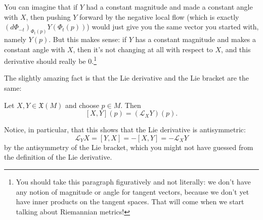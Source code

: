 You can imagine that if $Y$ had a constant magnitude and made a constant angle with $X$, then pushing $Y$ forward by the negative local flow (which is exactly $(d\Phi_{-t})_{\Phi_t(p)}Y(\Phi_t(p))$) would just give you the same vector you started with, namely $Y(p)$. But this makes sense: if $Y$ has a constant magnitude and makes a constant angle with $X$, then it's not changing at all with respect to $X$, and this derivative should really be 0.\footnote{You should take this paragraph figuratively and not literally: we don't have any notion of magnitude or angle for tangent vectors, because we don't yet have inner products on the tangent spaces. That will come when we start talking about Riemannian metrics!}

The slightly amazing fact is that the Lie derivative and the Lie bracket are the same:

\begin{proposition}\label{prop:Lie bracket = Lie derivative}
	Let $X,Y \in \mathfrak{X}(M)$ and choose $p \in M$. Then
	\[
		[X,Y](p) = (\mathcal{L}_XY)(p).
	\]
\end{proposition}

Notice, in particular, that this shows that the Lie derivative is antisymmetric:
\[
	\mathcal{L}_YX = [Y,X] = -[X,Y] = - \mathcal{L}_XY
\]
by the antisymmetry of the Lie bracket, which you might not have guessed from the definition of the Lie derivative.


